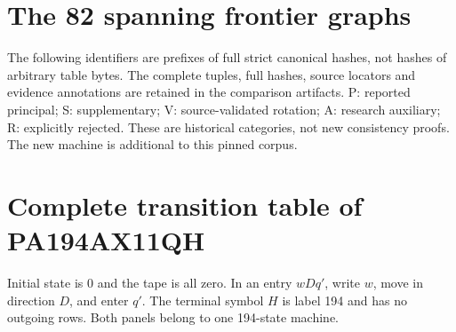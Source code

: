 \documentclass[11pt,letterpaper]{article}
\theoremstyle{definition}\newtheorem{definition}[theorem]{Definition}
\theoremstyle{remark}\newtheorem{remark}[theorem]{Remark}
\begin{document}
\section{The 82 spanning frontier graphs}
\label{app:frontier}
The following identifiers are prefixes of full strict canonical hashes,
not hashes of arbitrary table bytes. The complete tuples, full hashes,
source locators and evidence annotations are retained in the comparison
artifacts. P: reported principal; S: supplementary; V: source-validated
rotation; A: research auxiliary; R: explicitly rejected. These are historical
categories, not new consistency proofs. The new machine is additional to
this pinned corpus.


\section{Complete transition table of PA194AX11QH}
\label{app:table}
Initial state is $0$ and the tape is all zero. In an entry $wDq'$, write
$w$, move in direction $D$, and enter $q'$. The terminal symbol $H$ is label
194 and has no outgoing rows. Both panels belong to one 194-state machine.

\end{document}
